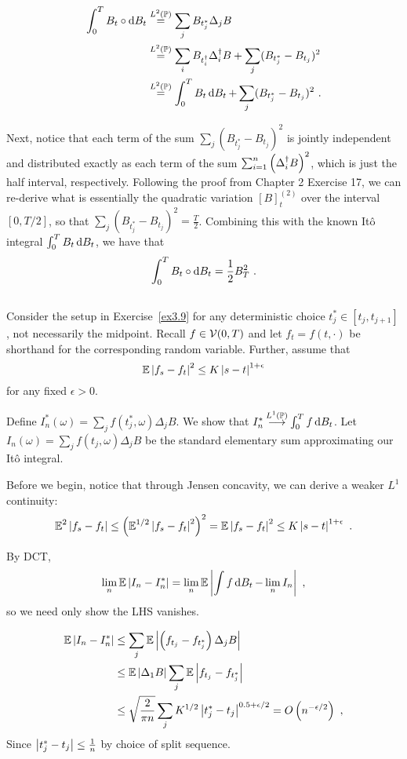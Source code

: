 \documentclass{article}
\begin{document}
\begin{align*}
  \int_0^TB_t\circ\mathop{\mathrm{d} B_t }
  &\mathrel{\overset{L^2(\operatorname{\mathbb{P}})}{=}} \sum_jB_{t_j^*}\Delta_jB\\
  &\mathrel{\overset{L^2(\operatorname{\mathbb{P}})}{=}} \sum_iB_{t_i^\dag}\Delta_i^\dag B+\sum_j(B_{t_j^*}-B_{t_j})^2\\
  &\mathrel{\overset{L^2(\operatorname{\mathbb{P}})}{=}} \int_0^TB_t\mathop{\mathrm{d} B_t }+\sum_j(B_{t_j^*}-B_{t_j})^2\,\,.
\end{align*}

Next, notice that each term of the sum \(\sum_j(B_{t_j^*}-B_{t_j})^2\) is jointly independent and distributed exactly as each term of the sum \(\sum_{i=1}^n\left({\Delta_i^\dag B}\right)^2\), which is just the half interval, respectively. Following the proof from Chapter 2 Exercise 17, we can re-derive what is essentially the quadratic variation \([B]_t^{(2)}\) over the interval \([0, T/2]\), so that \(\sum_j(B_{t_j^*}-B_{t_j})^2=\frac{T}{2}\). Combining this with the known It\^{o} integral \(\int_0^TB_t\mathop{\mathrm{d} B_t }\), we have that
\[
  \int_0^TB_t\circ\mathop{\mathrm{d} B_t }=\frac{1}{2}B_T^2\,\,.
  \]

  \subsection{}

  Consider the setup in Exercise~\ref{ex3.9} for any deterministic choice \(t_j^*\in[t_j,t_{j+1}]\), not necessarily the midpoint. Recall \(f\in\mathcal{V}(0, T)\) and let \(f_t=f(t,\cdot)\) be shorthand for the corresponding random variable. Further, assume that
  \[
    \operatorname{\mathbb{E}}\left\lvert{f_s-f_t}\right\rvert^2\le K\left\lvert{s-t}\right\rvert^{1+\epsilon}
  \]
  for any fixed \(\epsilon>0\).

  Define \(I_n^*(\omega)=\sum_jf(t_j^*, \omega)\Delta_j B\). We show that \(I_n^*\mathbin{\overset{L^1(\operatorname{\mathbb{P}})}{\longrightarrow}} \int_0^T f\mathop{\mathrm{d} B_t }\). Let \(I_n(\omega)=\sum_jf(t_j, \omega)\Delta_j B\) be the standard elementary sum approximating our It\^{o} integral.

  Before we begin, notice that through Jensen concavity, we can derive a weaker \(L^1\) continuity:
  \[
  \operatorname{\mathbb{E}}^2\left\lvert{f_s-f_t}\right\rvert\le\left({  \operatorname{\mathbb{E}}^{1/2}\left\lvert{f_s-f_t}\right\rvert^2}\right)^2=\operatorname{\mathbb{E}}\left\lvert{f_s-f_t}\right\rvert^2\le K\left\lvert{s-t}\right\rvert^{1+\epsilon}\,\,.
\]

By DCT,
\[
  \lim_n\operatorname{\mathbb{E}}\left\lvert{I_n- I_n^*}\right\rvert=  \lim_n\operatorname{\mathbb{E}}\left\lvert{\int f\mathop{\mathrm{d} B_t }- \lim_nI_n}\right\rvert\,\,,
\]
so we need only show the LHS vanishes.
    
  \begin{align*}
    \operatorname{\mathbb{E}}\left\lvert{I_n-I_n^*}\right\rvert
    &\le\sum_j\operatorname{\mathbb{E}}\left\lvert{ \left({f_{t_j}-f_{t_j^*}}\right) \Delta_jB}\right\rvert\\
    &\le\operatorname{\mathbb{E}}\left\lvert{\Delta_1B}\right\rvert\sum_j\operatorname{\mathbb{E}}\left\lvert{f_{t_j}-f_{t_j^*}}\right\rvert\\
    &\le \sqrt{\frac{2}{\pi n}}\sum_jK^{1/2}\left\lvert{t_j^*-t_j}\right\rvert^{0.5+\epsilon/2}=O\left({n^{-\epsilon/2}}\right)\,\,,
  \end{align*}
  Since \(\left\lvert{t_j^*-t_j}\right\rvert\le \frac{1}{n}\) by choice of split sequence.
\end{document}
